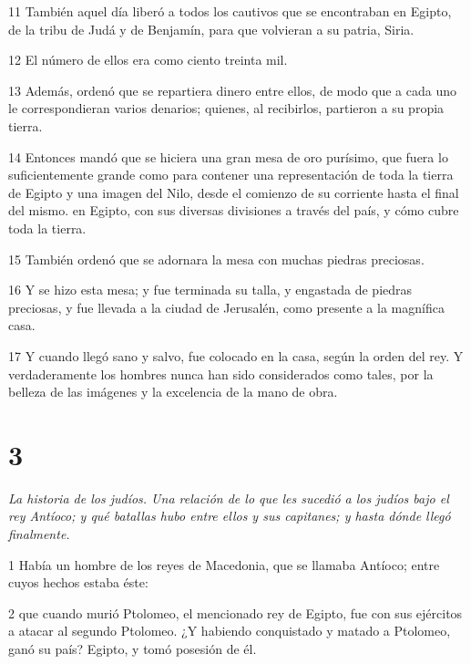 \par 11 También aquel día liberó a todos los cautivos que se encontraban en Egipto, de la tribu de Judá y de Benjamín, para que volvieran a su patria, Siria.

\par 12 El número de ellos era como ciento treinta mil.

\par 13 Además, ordenó que se repartiera dinero entre ellos, de modo que a cada uno le correspondieran varios denarios; quienes, al recibirlos, partieron a su propia tierra.

\par 14 Entonces mandó que se hiciera una gran mesa de oro purísimo, que fuera lo suficientemente grande como para contener una representación de toda la tierra de Egipto y una imagen del Nilo, desde el comienzo de su corriente hasta el final del mismo. en Egipto, con sus diversas divisiones a través del país, y cómo cubre toda la tierra.

\par 15 También ordenó que se adornara la mesa con muchas piedras preciosas.

\par 16 Y se hizo esta mesa; y fue terminada su talla, y engastada de piedras preciosas, y fue llevada a la ciudad de Jerusalén, como presente a la magnífica casa.

\par 17 Y cuando llegó sano y salvo, fue colocado en la casa, según la orden del rey. Y verdaderamente los hombres nunca han sido considerados como tales, por la belleza de las imágenes y la excelencia de la mano de obra.

\chapter{3}

\par \textit{La historia de los judíos. Una relación de lo que les sucedió a los judíos bajo el rey Antíoco; y qué batallas hubo entre ellos y sus capitanes; y hasta dónde llegó finalmente.}

\par 1 Había un hombre de los reyes de Macedonia, que se llamaba Antíoco; entre cuyos hechos estaba éste:

\par 2 que cuando murió Ptolomeo, el mencionado rey de Egipto, fue con sus ejércitos a atacar al segundo Ptolomeo. ¿Y habiendo conquistado y matado a Ptolomeo, ganó su país? Egipto, y tomó posesión de él.

